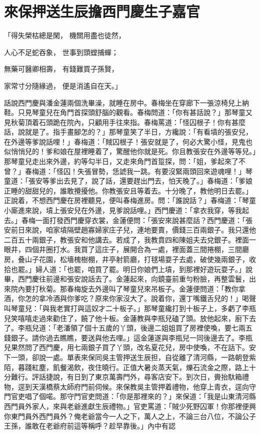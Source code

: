 %

\chapter{來保押送生辰擔\KG 西門慶生子嘉官}

「得失榮枯總是閑，  機關用盡也徒然，

人心不足蛇吞象，  世事到頭螳捕蟬；

無藥可醫卿相壽，  有錢難買子孫賢，

家常寸分隨緣過，  便是消遙自在天。」

話說西門慶與潘金蓮兩個洗畢澡，就睡在房中。春梅坐在穿廊下一張涼椅兒上納鞋。只見琴童兒在角門首探頭舒腦的觀看。春梅問道：「你有甚話說？」那琴童又見秋菊頂着石頭跪在院內，只顧用手往來指。春梅罵道：「怪囚根子！你有甚麼話，說就是了。指手畫腳怎的？」那琴童笑了半日，方纔說：「有看墳的張安兒，在外邊等爹說話哩！」春梅道：「賊囚根子！張安就是了，何必大驚小怪，見鬼也似悄悄兒的！爹和娘在屋裡睡着了，驚醒他你就是死。你且教張安在外邊等等兒。」那琴童兒走出來外邊，約等勾半日，又走來角門首踅探，問：「姐，爹起來了不曾？」春梅道：「怪囚！失張冒勢，恁諕我一跳。有要沒緊兩頭回來遊魂哩！」琴童道：「張安等爹出去見了，說了話，還要趕出門去，怕天晚了。」春梅道：「爹娘正睡的甜甜兒的，誰敢攪擾他。你教張安且等着去。十分晚了，教他明日去罷。」正說着，不想西門慶在房裡聽見，便叫春梅進房。問：「誰說話？」春梅道：「琴童小廝進來說，墳上張安兒在外邊，見爹說話哩。」西門慶道：「拿衣我穿，等我起去。」春梅一面打發西門慶穿衣裳，金蓮便問：「張安來說甚麼話？西門慶道：「張安前日來說，咱家墳隔壁趙寡婦家庄子兒，連地要賣，價錢三百兩銀子。我只還他二百五十兩銀子，教張安和他講去。若成了，我教賁四和陳姐夫去兌銀子。裡面一眼井，四個井圈打水。我買了這庄子，展開合為一處，裡面蓋三間捲棚，三間廳房，叠山子花園，松墻槐樹棚，井亭射箭廳，打毬場耍子去處，破使幾兩銀子，收拾也罷。」婦人道：「也罷，咱買了罷。明日你娘們上墳，到那裡好遊玩耍子。」說畢，西門慶往前邊和張安說話去了。金蓮起來，向鏡臺前重勻粉臉，再整雲鬟，出來院內要打秋菊。那春梅旋去外邊叫了琴童兒來吊板子。金蓮便問道：「教你拿酒，你怎的拿冷酒與你爹吃？原來你家沒大了。說着你，還丁嘴鐵舌兒的！」喝聲叫琴童兒：「與我老實打與這奴才二十板子。」那琴童纔打到十板子上，多虧了李瓶兒笑嘻嘻走過來勸住了，饒了他十板。金蓮教與李瓶兒磕了頭。放他起來，廚下去了。李瓶兒道：「老潘領了個十五歲的丫頭，後邊二姐姐買了房裡使喚，要七兩五錢銀子。請你過去瞧瞧，要送與他去哩。」這金蓮遂與李瓶兒一同後邊去了。李瓶兒果然問了西門慶，用七兩銀子買了丫頭，改名夏花兒，房中使喚，不在話下。安下一頭，卻說一處。單表來保同吳主管押送生辰担，自從離了清河縣，一路朝登紫陌，暮踐紅塵，飢餐渴飲，夜住曉行。正值大暑炎蒸天氣，爍石流金之際，路上十分難行。評話捷說，有日到了東京萬壽門外，尋客店安下。到次日，賫抬馱箱禮物，逕到天漢橋蔡太師府門前伺候。來保教吳主管押着禮物，他穿上青衣，逕向守門官吏唱了個喏。那守門官吏問道：「你是那裡來的？」來保道：「我是山東清河縣西門員外家人，來與老爺進獻生辰禮物。」官吏罵道：「賊少死野囚軍！你那裡便興你東門員外西門員外？俺老爺當今一人之下，萬人之上，不論三台八位，不論公子王孫，誰敢在老爺府前這等稱呼？趁早靠後。」內中有認